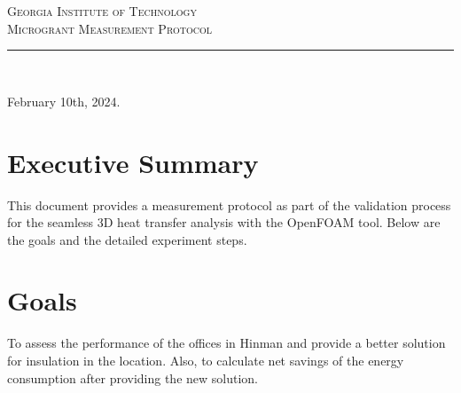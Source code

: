 \documentclass[12pt]{article}
\begin{document}
\begin{titlepage}

\newcommand{\HRule}{\rule{\linewidth}{0.2mm}}

\center
 
\textsc{\LARGE Georgia Institute of Technology}\\[0.5cm]
\textsc{\Large Microgrant Measurement Protocol}\\[0.5cm] %

\HRule \\[0.4cm]
\vspace{4cm}



\begin{minipage}{0.6\textwidth}

\vspace{5cm}

\begin{center} \large




\end{center}



\end{minipage}

\vspace{8cm}
\begin{center}
{\large February 10th, 2024.}\\[2cm] 
\end{center}



\end{titlepage}

\newpage

\section*{Executive Summary}
This document provides a measurement protocol as part of the validation process for the seamless 3D heat transfer analysis with the OpenFOAM tool. Below are the goals and the detailed experiment steps.


\section*{Goals} 
To assess the performance of the offices in Hinman and provide a better solution for insulation in the location. Also, to calculate net savings of the energy consumption after providing the new solution.
\end{document}
